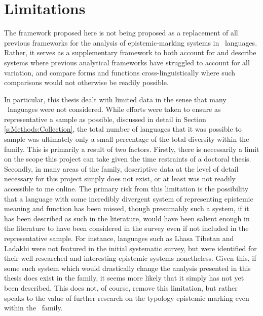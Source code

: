 \section{Limitations}
The framework proposed here is not being proposed as a replacement of all previous frameworks for the analysis of epistemic-marking systems in \lfam\ languages. Rather, it serves as a supplementary framework to both account for and describe systems where previous analytical frameworks have struggled to account for all variation, and compare forms and functions cross-linguistically where such comparisons would not otherwise be readily possible.

In particular, this thesis dealt with limited data in the sense that many \lfam\ languages were not considered. While efforts were taken to ensure as representative a sample as possible, discussed in detail in Section \ref{s:Methods:Collection}, the total number of languages that it was possible to sample was ultimately only a small percentage of the total diversity within the family. This is primarily a result of two factors. Firstly, there is necessarily a limit on the scope this project can take given the time restraints of a doctoral thesis. Secondly, in many areas of the family, descriptive data at the level of detail necessary for this project simply does not exist, or at least was not readily accessible to me online. The primary risk from this limitation is the possibility that a language with some incredibly divergent system of representing epistemic meaning and function has been missed, though presumably such a system, if it has been described as such in the literature, would have been salient enough in the literature to have been considered in the survey even if not included in the representative sample. For instance, languages such as Lhasa Tibetan and Ladakhi were not featured in the initial systematic survey, but were identified for their well researched and interesting epistemic systems nonetheless. Given this, if some such system which would drastically change the analysis presented in this thesis does exist in the family, it seems more likely that it simply has not yet been described. This does not, of course, remove this limitation, but rather speaks to the value of further research on the typology epistemic marking even within the \lfam\ family.

